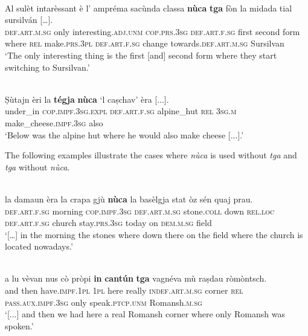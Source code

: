 \ea
\label{ex:relloc3}
\\
\gll    Al sulèt intarèssant è l’ ampréma sacùnda classa \textbf{nùca} \textbf{tga} fòn la midada tial sursilván […].\\
\textsc{def.art.m.sg} only interesting.\textsc{adj.unm} \textsc{cop.prs.3sg} \textsc{def.art.f.sg} first second form where \textsc{rel} make.\textsc{prs.3pl} \textsc{def.art.f.sg} change towards.\textsc{def.art.m.sg} Sursilvan\\
\glt `The only interesting thing is the first [and] second form where they start switching to Sursilvan.'
\z

\ea
\label{ex:relloc4}
\\
\gll Ṣùtajn èri la \textbf{tégja} \textbf{nùca} `l caṣchav' èra [...].\\
under\_in \textsc{cop.impf.3sg.expl} \textsc{def.art.f.sg} alpine\_hut \textsc{rel} \textsc{3sg.m} make\_cheese.\textsc{impf.3sg} also\\
\glt `Below was the alpine hut where he would also make cheese [...].'
\z

The following examples illustrate the cases where \textit{nùca} is used without \textit{tga} and \textit{tga} without \textit{nùca}.

\ea
\label{ex:relloc5}
\\
\gll    […] la damaun èra la crapa gjù \textbf{nùca} la basèlgja stat òz sén quaj prau.\\
{} \textsc{def.art.f.sg} morning \textsc{cop.impf.3sg} \textsc{def.art.m.sg} stone.\textsc{coll} down \textsc{rel.loc} \textsc{def.art.f.sg} church stay.\textsc{prs.3sg} today on \textsc{dem.m.sg} field\\
\glt `[…] in the morning the stones where down there on the field where the church is located nowadays.'
\z

\ea
\label{ex:relloc6}
\\
\gll [...] a lu vèvan nus cò pròpi \textbf{in} \textbf{cantún} \textbf{tga} vagnéva mù raṣdau ròmòntsch.\\
{} and then have.\textsc{impf.1pl} \textsc{1pl} here really \textsc{indef.art.m.sg} corner \textsc{rel} \textsc{pass.aux.impf.3sg} only speak.\textsc{ptcp.unm} Romansh.\textsc{m.sg} \\
\glt `[...] and then we had here a real Romansh corner where only Romansh was spoken.'
\z

